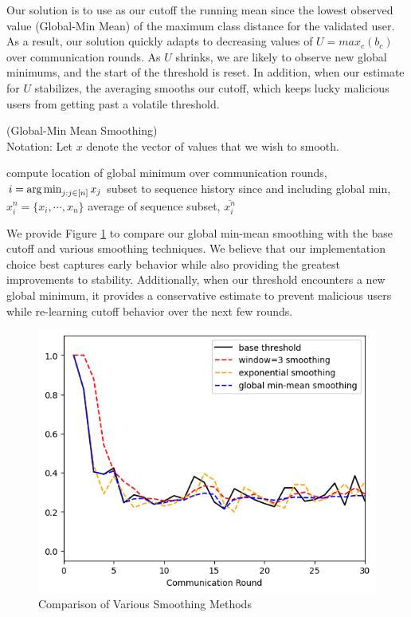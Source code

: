 \documentclass{article} %
\begin{document}
Our solution is to use as our cutoff the running mean since the lowest observed value (Global-Min Mean) of the maximum class distance for the validated user. As a result, our solution quickly adapts to decreasing values of $U = max_c (b_c)$ over communication rounds. As $U$ shrinks, we are likely to observe new global minimums, and the start of the threshold is reset. In addition, when our estimate for $U$ stabilizes, the averaging smooths our cutoff, which keeps lucky malicious users from getting past a volatile threshold. 

\begin{algorithm}[H]
\caption{ (Global-Min Mean Smoothing) \\ 
Notation: Let $x$ denote the vector of values that we wish to smooth.
}
\label{alg:smoothing}
\begin{algorithmic}[1]

        \State compute location of global minimum over communication rounds, $i = \operatorname*{arg\,min}_{j: j \in \mathopen[ n \mathclose]} x_j$
        \State subset to sequence history since and including global min, $x_i^n = \{x_i, \cdots, x_n \}$
        \State \Return average of sequence subset, $\overline{x_i^n}$
    \EndProcedure
\end{algorithmic}
\end{algorithm}

We provide Figure \ref{fig:min-mean} to compare our global min-mean smoothing with the base cutoff and various smoothing techniques. We believe that our implementation choice best captures early behavior while also providing the greatest improvements to stability. Additionally, when our threshold encounters a new global minimum, it provides a conservative estimate to prevent malicious users while re-learning cutoff behavior over the next few rounds.

\begin{figure}[H]
    \centering
    
    \includegraphics[width=.5\textwidth]{99_article/99_visuals/extra_plots/min_mean--alpha10000--alpha_val10000--d_rounds30.png}
    \caption{Comparison of Various Smoothing Methods}
    \label{fig:min-mean}
\end{figure}
\end{document}
